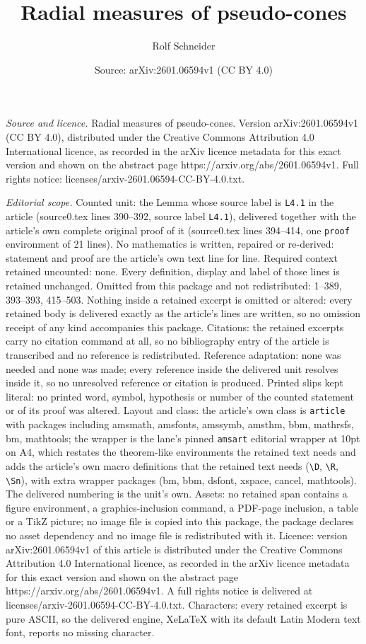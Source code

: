 \documentclass[10pt,a4paper]{amsart}
\title[Radial measures of pseudo-cones]{Radial measures of pseudo-cones}
\author{Rolf Schneider}
\date{Source: arXiv:2601.06594v1 (CC BY 4.0)}
\begin{document}
\maketitle

\noindent\emph{Source and licence.} Radial measures of pseudo-cones. Version arXiv:2601.06594v1 (CC BY 4.0), distributed under the Creative Commons Attribution 4.0 International licence, as recorded in the arXiv licence metadata for this exact version and shown on the abstract page https://arxiv.org/abs/2601.06594v1. Full rights notice: licenses/arxiv-2601.06594-CC-BY-4.0.txt.\par\smallskip

\noindent\textit{Editorial scope.} Counted unit: the Lemma whose source label is \texttt{L4.1} in the article (source0.tex lines 390--392, source label \texttt{L4.1}), delivered together with the article's own complete original proof of it (source0.tex lines 394--414, one \texttt{proof} environment of 21 lines). No mathematics is written, repaired or re-derived: statement and proof are the article's own text line for line. Required context retained uncounted: none. Every definition, display and label of those lines is retained unchanged. Omitted from this package and not redistributed: 1--389, 393--393, 415--503. Nothing inside a retained excerpt is omitted or altered: every retained body is delivered exactly as the article's lines are written, so no omission receipt of any kind accompanies this package. Citations: the retained excerpts carry no citation command at all, so no bibliography entry of the article is transcribed and no reference is redistributed. Reference adaptation: none was needed and none was made; every reference inside the delivered unit resolves inside it, so no unresolved reference or citation is produced. Printed slips kept literal: no printed word, symbol, hypothesis or number of the counted statement or of its proof was altered. Layout and class: the article's own class is \texttt{article} with packages including amsmath, amsfonts, amssymb, amsthm, bbm, mathrsfs, bm, mathtools; the wrapper is the lane's pinned \texttt{amsart} editorial wrapper at 10pt on A4, which restates the theorem-like environments the retained text needs and adds the article's own macro definitions that the retained text needs (\texttt{\textbackslash D}, \texttt{\textbackslash R}, \texttt{\textbackslash Sn}), with extra wrapper packages (bm, bbm, dsfont, xspace, cancel, mathtools). The delivered numbering is the unit's own. Assets: no retained span contains a figure environment, a graphics-inclusion command, a PDF-page inclusion, a table or a TikZ picture; no image file is copied into this package, the package declares no asset dependency and no image file is redistributed with it. Licence: version arXiv:2601.06594v1 of this article is distributed under the Creative Commons Attribution 4.0 International licence, as recorded in the arXiv licence metadata for this exact version and shown on the abstract page https://arxiv.org/abs/2601.06594v1. A full rights notice is delivered at licenses/arxiv-2601.06594-CC-BY-4.0.txt. Characters: every retained excerpt is pure ASCII, so the delivered engine, XeLaTeX with its default Latin Modern text font, reports no missing character.
\end{document}
